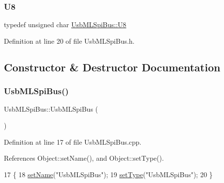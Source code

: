 \mbox{\label{classUsbMLSpiBus_a2481f08754a9a74061e1e9e68bbcac85}} 
\subsubsection{\texorpdfstring{U8}{U8}}
{\footnotesize\ttfamily typedef unsigned char \hyperlink{classUsbMLSpiBus_a2481f08754a9a74061e1e9e68bbcac85}{Usb\+M\+L\+Spi\+Bus\+::\+U8}}



Definition at line 20 of file Usb\+M\+L\+Spi\+Bus.\+h.



\subsection{Constructor \& Destructor Documentation}
\mbox{\label{classUsbMLSpiBus_a30c4c229be1192e5a42afdaba700d1ed}} 
\subsubsection{\texorpdfstring{Usb\+M\+L\+Spi\+Bus()}{UsbMLSpiBus()}}
{\footnotesize\ttfamily Usb\+M\+L\+Spi\+Bus\+::\+Usb\+M\+L\+Spi\+Bus (\begin{DoxyParamCaption}{ }\end{DoxyParamCaption})}



Definition at line 17 of file Usb\+M\+L\+Spi\+Bus.\+cpp.



References Object\+::set\+Name(), and Object\+::set\+Type().


\begin{DoxyCode}
17                            \{
18   \hyperlink{classObject_ae30fea75683c2d149b6b6d17c09ecd0c}{setName}(\textcolor{stringliteral}{"UsbMLSpiBus"});
19   \hyperlink{classObject_aae534cc9d982bcb9b99fd505f2e103a5}{setType}(\textcolor{stringliteral}{"UsbMLSpiBus"});
20 \}
\end{DoxyCode}
\mbox{\label{classUsbMLSpiBus_a7173a534262c4d0d6e3a09a23acbd983}} 

